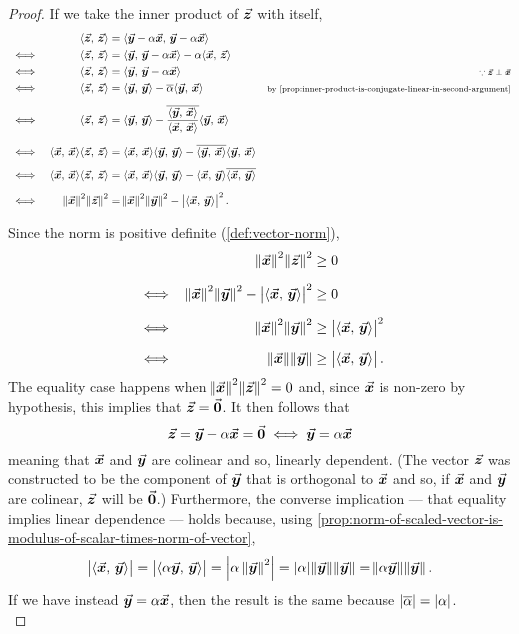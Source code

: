 \documentclass[../MathsNotesBase.tex]{subfiles}
\begin{document}
{\begin{proof}
			If we take the inner product of $\vec{\bm{z}}$ with itself,
			\[\begin{aligned}
				&& \inner{\z}{\z} &= \inner{\y - \alpha \x}{\y - \alpha \x} \\
				&\iff & \inner{\z}{\z} &= \inner{\y}{\y - \alpha \x} - \alpha \inner{\x}{\z} \\
				&\iff & \inner{\z}{\z} &= \inner{\y}{\y - \alpha \x} &\sidecomment{${ \because \z \perp \x }$} \\
				&\iff & \inner{\z}{\z} &= \inner{\y}{\y} - \conj{\alpha} \inner{\y}{\x} &\sidecomment{by \ref{prop:inner-product-is-conjugate-linear-in-second-argument}} \nn
				&\iff & \inner{\z}{\z} &= \inner{\y}{\y} - \conj{\frac{ \inner{\y}{\x} }{ \inner{\x}{\x} }} \inner{\y}{\x} \nn
				&\iff & \inner{\x}{\x} \inner{\z}{\z} &= \inner{\x}{\x} \inner{\y}{\y} - \conj{\inner{\y}{\x}} \inner{\y}{\x} \nn
				&\iff & \inner{\x}{\x} \inner{\z}{\z} &= \inner{\x}{\x} \inner{\y}{\y} - \inner{\x}{\y} \conj{\inner{\x}{\y}} \nn
				&\iff & \norm{\x}^2 \norm{\z}^2 &= \norm{\x}^2 \norm{\y}^2 - \modulus{\inner{\x}{\y}}^2.
			\end{aligned}\]
		
			Since the norm is positive definite (\ref{def:vector-norm}), 
			\[\begin{aligned}
				&& \norm{\x}^2 \norm{\z}^2 &\geq 0  \nn
				&\iff & \norm{\x}^2 \norm{\y}^2 - \modulus{\inner{\x}{\y}}^2 &\geq 0  \nn
				&\iff & \norm{\x}^2 \norm{\y}^2 &\geq \modulus{\inner{\x}{\y}}^2 \nn
				&\iff & \norm{\x} \norm{\y} &\geq \modulus{\inner{\x}{\y}}.
			\end{aligned}\]
			The equality case happens when ${ \norm{\vec{\bm{x}}}^2 \norm{\vec{\bm{z}}}^2 = 0 }$ and, since $\vec{\bm{x}}$ is non-zero by hypothesis, this implies that ${ \vec{\bm{z}} = \vec{\bm{0}} }$. It then follows that
			\[ \vec{\bm{z}} = \vec{\bm{y}} - \alpha \vec{\bm{x}} = \vec{\bm{0}} \iff \vec{\bm{y}} = \alpha \vec{\bm{x}}  \]
			meaning that $\vec{\bm{x}}$ and $\vec{\bm{y}}$ are colinear and so, linearly dependent. (The vector $\vec{\bm{z}}$ was constructed to be the component of $\vec{\bm{y}}$ that is orthogonal to $\vec{\bm{x}}$ and so, if $\vec{\bm{x}}$ and $\vec{\bm{y}}$ are colinear, $\vec{\bm{z}}$ will be $\vec{\bm{0}}$.) Furthermore, the converse implication --- that equality implies linear dependence --- holds because, using \autoref{prop:norm-of-scaled-vector-is-modulus-of-scalar-times-norm-of-vector},
			\[ \left\lvert\langle \vec{\bm{x}},\, \vec{\bm{y}} \rangle\right\rvert = \left\lvert\langle \alpha \vec{\bm{y}},\, \vec{\bm{y}} \rangle\right\rvert = \left\lvert\alpha \, \norm{\vec{\bm{y}}}^2\right\rvert = \left\lvert\alpha\right\rvert \norm{\vec{\bm{y}}} \norm{\vec{\bm{y}}} = \norm{\alpha\vec{\bm{y}}} \norm{\vec{\bm{y}}}. \]
			If we have instead ${ \vec{\bm{y}} = \alpha \vec{\bm{x}} }$, then the result is the same because ${ \left\lvert\overline{\alpha}\right\rvert = \left\lvert\alpha\right\rvert }$.\\
			


\end{proof}}
\end{document}
